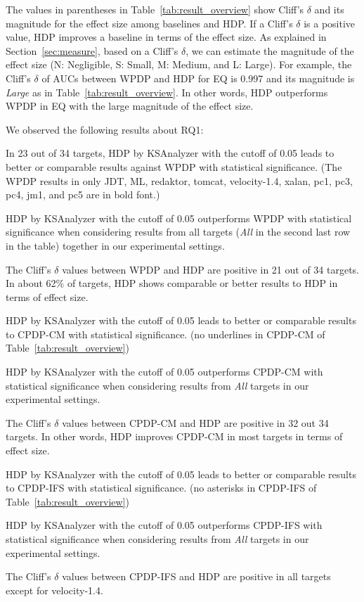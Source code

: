 The values in parentheses in Table~\ref{tab:result_overview} show Cliff's $\delta$ and its magnitude for the effect size among baselines and HDP. If a Cliff's $\delta$ is a positive value, HDP improves a baseline in terms of the effect size. As explained in Section~\ref{sec:measure}, based on a Cliff's $\delta$, we can estimate the magnitude of the effect size (N: Negligible, S: Small, M: Medium, and L: Large). For example, the Cliff's $\delta$ of AUCs between WPDP and HDP for EQ is 0.997 and its magnitude is {\em Large} as in Table~\ref{tab:result_overview}. In other words, HDP outperforms WPDP in EQ with the large magnitude of the effect size.

We observed the following results about RQ1:
\squishlist
	\item In 23 out of 34 targets, HDP by KSAnalyzer with the cutoff of
	0.05 leads to better or comparable results against WPDP with statistical
	significance. (The WPDP results in only JDT, ML, redaktor, tomcat, velocity-1.4, xalan, pc1, pc3, pc4, jm1, and pc5 are in bold font.)
	\item HDP by KSAnalyzer with the cutoff of 0.05 outperforms
	WPDP with statistical significance when considering
	results from all targets ({\em All} in the second last row in the table) together in
	our experimental settings.
	\item The Cliff's $\delta$ values between WPDP and HDP are positive in 21 out of 34 targets. In about 62\% of targets, HDP shows comparable or better results to HDP in terms of effect size.
	\item HDP by KSAnalyzer with the cutoff of 0.05
	leads to better or comparable results to CPDP-CM
	with statistical significance. (no underlines in CPDP-CM of
	Table~\ref{tab:result_overview})
	\item HDP by KSAnalyzer with the cutoff of 0.05 outperforms
	CPDP-CM with statistical significance
	when considering results from {\em All} targets in our experimental
	settings.
	\item The Cliff's $\delta$ values between CPDP-CM and HDP are positive in 32 out 34 targets. In other words, HDP improves CPDP-CM in most targets in terms of effect size.
	\item HDP by KSAnalyzer with the cutoff of 0.05
	leads to better or comparable results to CPDP-IFS with
	statistical significance. (no asterisks in CPDP-IFS of
	Table~\ref{tab:result_overview})
	\item HDP by KSAnalyzer with the cutoff of 0.05 outperforms
	CPDP-IFS with statistical significance
	when considering results from {\em All} targets in our experimental
	settings.
	\item The Cliff's $\delta$ values between CPDP-IFS and HDP are positive in all targets except for velocity-1.4.
\squishend

